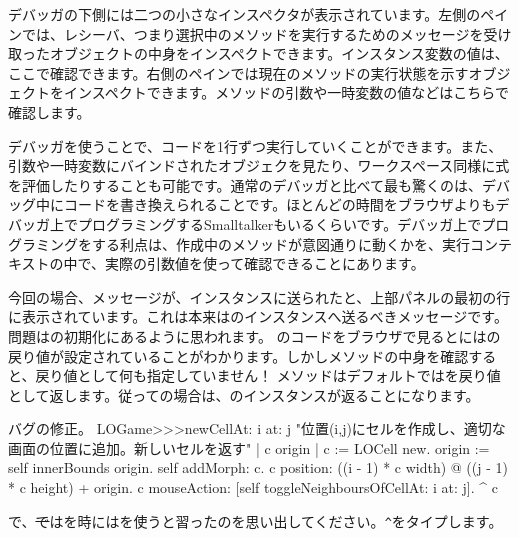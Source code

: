 \documentclass[a4paper,10pt,twoside]{book}
\begin{document}
デバッガの下側には二つの小さなインスペクタが表示されています。左側のペインでは、レシーバ、つまり選択中のメソッドを実行するためのメッセージを受け取ったオブジェクトの中身をインスペクトできます。インスタンス変数の値は、ここで確認できます。右側のペインでは現在のメソッドの実行状態を示すオブジェクトをインスペクトできます。メソッドの引数や一時変数の値などはこちらで確認します。

デバッガを使うことで、コードを1行ずつ実行していくことができます。また、引数や一時変数にバインドされたオブジェクを見たり、ワークスペース同様に式を評価したりすることも可能です。通常のデバッガと比べて最も驚くのは、デバッグ中にコードを書き換えられることです。ほとんどの時間をブラウザよりもデバッガ上でプログラミングするSmalltalkerもいるくらいです。デバッガ上でプログラミングをする利点は、作成中のメソッドが意図通りに動くかを、実行コンテキストの中で、実際の引数値を使って確認できることにあります。

今回の場合、メッセージが、インスタンスに送られたと、上部パネルの最初の行に表示されています。これは本来はのインスタンスへ送るべきメッセージです。問題はの初期化にあるように思われます。
のコードをブラウザで見るとにはの戻り値が設定されていることがわかります。しかしメソッドの中身を確認すると、戻り値として何も指定していません！ メソッドはデフォルトではを戻り値として返します。従っての場合は、のインスタンスが返ることになります。

\dothis{デバッガウィンドウを閉じてください。
その後で、``\ct{^ c}''と \ct{LOGame>>>newCellAt:at:}メソッドの最後に追加して、\ct{c}を返すようにします。
(\mthref{newCellAt:at:nobug}参照。)}

\begin{method}{バグの修正。}
LOGame>>>newCellAt: i at: j
   "位置(i,j)にセルを作成し、適切な画面の位置に追加。新しいセルを返す"
   | c origin |
   c := LOCell new.
   origin := self innerBounds origin.
   self addMorph: c.
   c position: ((i - 1) * c width) @ ((j - 1) * c height) + origin.
   c mouseAction: [self toggleNeighboursOfCellAt: i at: j].
   ^ c
\end{method}

\noindent
{}で、\st ではを時には\ct{^}を使うと習ったのを思い出してください。\verb|^|をタイプします。
\end{document}
